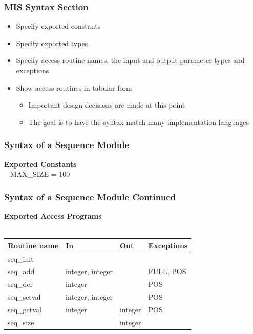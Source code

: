 \documentclass[t,12pt,numbers,fleqn]{beamer}
\begin{document}

\begin{frame}
\frametitle{MIS Syntax Section}
\begin{itemize}
\item Specify exported constants
\item Specify exported types
\item Specify access routine names, the input and output parameter types and exceptions
\item Show access routines in tabular form
\begin{itemize}
\item Important design decisions are made at this point
\item The goal is to have the syntax match many implementation languages
\end{itemize}
\end{itemize}
\end{frame}


\begin{frame}
\frametitle{Syntax of a Sequence Module}

\textbf{Exported Constants}\\
~\newline
MAX\_SIZE = 100\\

\end{frame}


\begin{frame}
\frametitle{Syntax of a Sequence Module Continued}

\textbf{Exported Access Programs}\\
~\newline
\begin{tabular}{| l | l | l | l |}
\hline
\textbf{Routine name} & \textbf{In} & \textbf{Out} & \textbf{Exceptions}\\
\hline
seq\_init & ~ & ~ & ~\\
\hline
seq\_add & integer, integer & ~ & FULL, POS\\
\hline
seq\_del & integer & ~ & POS\\
\hline
seq\_setval & integer, integer & ~ & POS\\
\hline
seq\_getval & integer & integer & POS\\
\hline
seq\_size & ~ & integer & ~\\
\hline

\end{tabular}

\end{frame}
\end{document}
